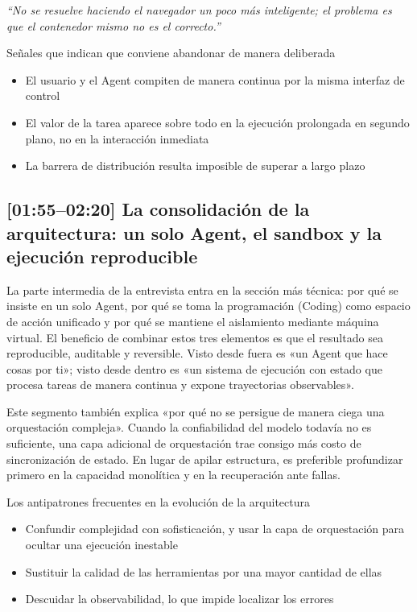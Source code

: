 \textit{``No se resuelve haciendo el navegador un poco más inteligente; el problema es que el contenedor mismo no es el correcto.''}

\begin{knowledgebox}{Señales que indican que conviene abandonar de manera deliberada}
\begin{itemize}
    \item El usuario y el Agent compiten de manera continua por la misma interfaz de control
    \item El valor de la tarea aparece sobre todo en la ejecución prolongada en segundo plano, no en la interacción inmediata
    \item La barrera de distribución resulta imposible de superar a largo plazo
\end{itemize}
\end{knowledgebox}

\subsection{[01:55--02:20] La consolidación de la arquitectura: un solo Agent, el sandbox y la ejecución reproducible}

La parte intermedia de la entrevista entra en la sección más técnica: por qué se insiste en un solo Agent, por qué se toma la programación (Coding) como espacio de acción unificado y por qué se mantiene el aislamiento mediante máquina virtual. El beneficio de combinar estos tres elementos es que el resultado sea reproducible, auditable y reversible. Visto desde fuera es «un Agent que hace cosas por ti»; visto desde dentro es «un sistema de ejecución con estado que procesa tareas de manera continua y expone trayectorias observables».

Este segmento también explica «por qué no se persigue de manera ciega una orquestación compleja». Cuando la confiabilidad del modelo todavía no es suficiente, una capa adicional de orquestación trae consigo más costo de sincronización de estado. En lugar de apilar estructura, es preferible profundizar primero en la capacidad monolítica y en la recuperación ante fallas.

\begin{warningbox}{Los antipatrones frecuentes en la evolución de la arquitectura}
\begin{itemize}
    \item Confundir complejidad con sofisticación, y usar la capa de orquestación para ocultar una ejecución inestable
    \item Sustituir la calidad de las herramientas por una mayor cantidad de ellas
    \item Descuidar la observabilidad, lo que impide localizar los errores
\end{itemize}
\end{warningbox}

